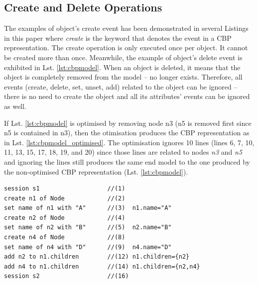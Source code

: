 \documentclass[sigconf]{acmart}
\begin{document}
\subsection{Create and Delete Operations}
\label{subsec:create_and_delete_operations}
The examples of object's create event has been demonstrated in several Listings in this paper where \emph{create} is the keyword that denotes the event in a CBP representation. The create operation is only executed  once per object. It cannot be created more than once. Meanwhile, the example of object's delete event is exhibited in Lst. \ref{lst:cbpmodel}. When an object is deleted, it means that the object is completely removed from the model -- no longer exists. Therefore, all events (create, delete, set, unset, add) related to the object can be ignored -- there is no need to create the object and all its attributes' events can be ignored as well. 

If  Lst. \ref{lst:cbpmodel} is optimised by removing node n3 (n5 is removed first since n5 is contained in n3), then the otimisation produces the CBP representation as in Lst. \ref{lst:cbpmodel_optimised}. The optimisation ignores 10 lines (lines 6, 7, 10, 11, 13, 15, 17, 18, 19, and 20) since those lines are related to nodes \emph{n3} and \emph{n5} and ignoring the lines still produces the same end model to the one produced by the non-optimised CBP representation (Lst. \ref{lst:cbpmodel}). 

\begin{lstlisting}[style=eol,caption={Change-based representation of the model of Figure \ref{fig:initial_model} after removal of node \emph{n5}.},label=lst:cbpmodel_optimised]
session s1                   //(1)
create n1 of Node            //(2)
set name of n1 with "A"      //(3)  n1.name="A"
create n2 of Node            //(4)
set name of n2 with "B"      //(5)  n2.name="B"
create n4 of Node            //(8)
set name of n4 with "D"      //(9)  n4.name="D"
add n2 to n1.children        //(12) n1.children={n2}
add n4 to n1.children        //(14) n1.children={n2,n4}
session s2                   //(16)
\end{lstlisting}
\end{document}
